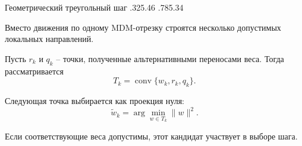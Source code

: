 \SPBGSplitSlide
  {Геометрический треугольный шаг}
  {.325}{.46}
  {%
    \ReportTriangleStep
  }
  {.785}{.34}
  {%
    \SplitBody
    Вместо движения по одному MDM-отрезку строятся несколько допустимых
    локальных направлений.

    \vspace{.18cm}
    Пусть \(r_k\) и \(q_k\) -- точки, полученные альтернативными переносами
    веса. Тогда рассматривается
    \[
      T_k=\operatorname{conv}\{w_k,r_k,q_k\}.
    \]

    Следующая точка выбирается как проекция нуля:
    \[
      \widetilde w_k
      =\arg\min_{w\in T_k}\|w\|^2.
    \]

    Если соответствующие веса допустимы, этот кандидат участвует в выборе
    шага.
  }
